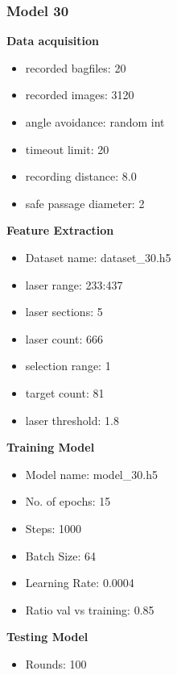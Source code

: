 \subsubsection{Model 30\label{model_30} }
\begin{multicols}{2}\textbf{Data acquisition}
\begin{itemize}
\setlength\itemsep{0.1em}
\item recorded bagfiles: 20
\item recorded images: 3120
\item angle avoidance: random int
\item timeout limit: 20
\item recording distance: 8.0
\item safe passage diameter: 2
\end{itemize}
\textbf{Feature Extraction}
\begin{itemize}
\setlength\itemsep{0.1em}
\item Dataset name: dataset\_30.h5
\item  laser range: 233:437
\item  laser sections: 5
\item  laser count: 666
\item  selection range: 1
\item  target count: 81
\item  laser threshold: 1.8
\end{itemize}
\columnbreak\textbf{Training Model}
\begin{itemize}
\setlength\itemsep{0.1em}
\item  Model name: model\_30.h5
\item  No. of epochs: 15
\item  Steps: 1000
\item  Batch Size: 64
\item  Learning Rate: 0.0004
\item  Ratio val vs training: 0.85
\end{itemize}
\textbf{Testing Model}
\begin{itemize}
\setlength\itemsep{0.1em}
\item Rounds: 100
\newline
\newline
\newline
\newline
\newline
\newline
\newline
\newline

\end{itemize}
\end{multicols}
